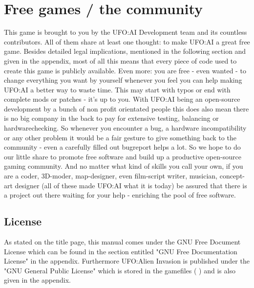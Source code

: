 \section{Free games / the community}
This game is brought to you by the UFO:AI Development team and its countless contributors. All of them share at least one thought: to make UFO:AI a great free %
 game. Besides detailed legal implications, mentioned in the following section and given in the appendix, most of all this means that every piece of code used to create this game is publicly available. Even more: you are free - even wanted - to change everything you want by yourself whenever you feel you can help making UFO:AI a better way to waste time. This may start with typos or end with complete mods or patches - it's up to you.  With UFO:AI being  an open-source development by a bunch of non profit orientated people this does also mean there is no big company in the back to pay for extensive testing, balancing or hardwarechecking. So whenever you encounter a bug, a hardware incompatibility or any other problem it would be a fair gesture to give something back to the community - even a carefully filled out bugreport helps a lot. So we hope to do our little share to promote free software and build up a productive open-source gaming community. And no matter what kind of skills you call your own, if you are a coder, 3D-moder, map-designer, even film-script writer, musician, concept-art designer (all of these made UFO:AI what it is today) be assured that there is a project out there waiting for your help - enriching the pool of free software.

\subsection{License}
As stated on the title page, this manual comes under the GNU Free Document License which can be found  in the section entitled "GNU Free Documentation License" in the appendix.
Furthermore UFO:Alien Invasion is published under the "GNU General Public License" which is stored in the gamefiles ( ) and is also given in the appendix.

